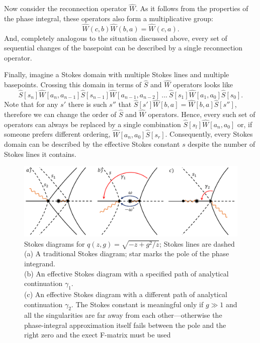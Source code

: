 \documentclass[atmp]{ipart_v1}
\def\S{\widehat{S}}
\def\W{\widehat{W}}
\begin{document}
Now consider the reconnection operator $\W$. As it follows from the properties of the phase integral, 
these operators also form a multiplicative group:
\begin{equation}
\W(c,b)\W(b,a) = \W(c,a).
\end{equation}
And, completely analogous to the situation discussed above, every set of sequential changes of the basepoint
can be described by a single reconnection operator.

Finally, imagine a Stokes domain with multiple Stokes lines and multiple basepoints. Crossing this 
domain in terms of $\S$ and $\W$ operators looks like
\begin{equation}
\S[s_n]\W[a_n,a_{n-1}]\S[s_{n-1}]\W[a_{n-1},a_{n-2}]\ ...\ \S[s_1]\W[a_1,a_0]\S[s_0].
\end{equation}
Note that for any $s'$ there is such $s''$ that $\S[s']\W[b,a]=\W[b,a]\S[s'']$, therefore
we can change the order of $\S$ and $\W$ operators. Hence,
every such set of operators can always be replaced by a single combination $\S[s_l] \W[a_n,a_0]$ or, 
if someone prefers different ordering, $\W[a_n,a_0] \S[s_r]$. Consequently, every Stokes domain can 
be described by the effective Stokes constant $s$ despite the number of Stokes lines it contains.

\begin{figure}
\centering
\noindent
\includegraphics[width=\textwidth]{effsd_1.png}
\caption{
Stokes diagrams for $q(z,g)=\sqrt{-z + g^2/z}$; Stokes lines are dashed
\\
(a) A traditional Stokes diagram; star marks the pole of the phase integrand. 
\\
(b) An effective Stokes diagram with a specified path of analytical continuation $\gamma_1$. 
\\
(c) An effective Stokes diagram with a different path of analytical continuation $\gamma_2$.
The Stokes constant is meaningful only if $g \gg 1$ and all the singularities are far away 
from each other---otherwise the phase-integral approximation itself fails between 
the pole and the right zero and the exect F-matrix must be used}
\label{fig:effsd_1}
\end{figure}  
\end{document}
